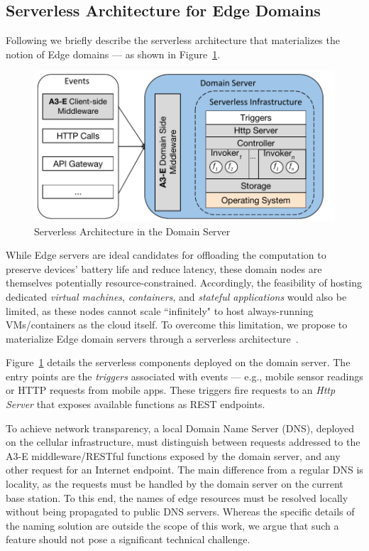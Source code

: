 \subsection{Serverless Architecture for Edge Domains}
\label{subsec:ServerlessArchCont}

Following we briefly describe the serverless architecture that materializes the notion of Edge domains --- as shown in Figure~\ref{fig:domain-edge-arch}. 

\begin{figure}[htb]
	\includegraphics[width=.7\textwidth]{figs/ServerlessGenericArchEdit}
	\caption{Serverless Architecture in the Domain Server}
	\label{fig:domain-edge-arch}
\end{figure}

While Edge servers are ideal candidates for offloading the computation to preserve devices' battery life and reduce latency, these domain nodes are themselves potentially resource-constrained. Accordingly, the feasibility of hosting dedicated \textit{virtual machines}, \textit{containers}, and \textit{stateful applications} would also be limited, as these nodes cannot scale ``infinitely" to host always-running VMs/containers as the cloud itself. To overcome this limitation, we propose to materialize Edge domain servers through a serverless architecture~\cite{Roberts:2016,GarrigaMendonca2017}. 

Figure~\ref{fig:domain-edge-arch} details the serverless components deployed on the domain server. The entry points are the \textit{triggers} associated with events --- e.g.,  mobile sensor readings or HTTP requests from mobile apps.  
These triggers fire requests to an \textit{Http Server} that exposes available functions as REST endpoints. 

To achieve network transparency, a local Domain Name Server (DNS), deployed on the cellular infrastructure, must distinguish between requests addressed to the A3-E middleware/RESTful functions exposed by the domain server, and any other request for an Internet endpoint. The main difference from a regular DNS is locality, as the requests must be handled by the domain server on the current base station. To this end, the names of edge resources must be resolved locally without being propagated to public DNS servers. Whereas the specific details of the naming solution are outside the scope of this work, we argue that such a feature should not pose a significant technical challenge.%

